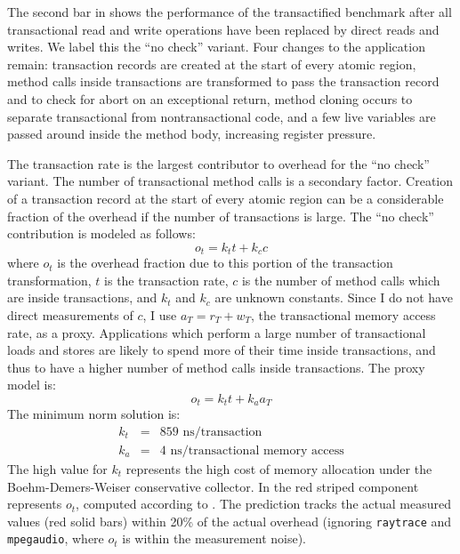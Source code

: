 
The second bar in  shows
the performance of the transactified benchmark after all transactional
read and write operations have been replaced by direct reads and
writes.   We label this the ``no check'' variant.
Four changes to the application remain: transaction records
are created at the start of every atomic region, method calls inside
transactions are transformed to pass the transaction record and to
check for abort on an exceptional return, method cloning occurs to
separate transactional from nontransactional code, and a few live
variables are passed around inside the method body, increasing
register pressure.

The transaction rate is the largest contributor
to overhead for the ``no check'' variant.  The number of transactional
method calls is a secondary factor.
Creation of a transaction record at the start of every atomic region
can be a considerable fraction of the overhead if the number of
transactions is large.  The ``no check''
contribution is modeled as follows:
\begin{equation}
o_t = k_t t + k_c c
\end{equation}
where $o_t$ is the overhead fraction due to this portion of the
transaction transformation, $t$ is the transaction rate, $c$
is the number of method calls which are inside transactions, and $k_t$
and $k_c$ are unknown constants.  Since I do not have direct
measurements of $c$, I use $a_T = r_T + w_T$,
the transactional memory access rate, as a proxy.  Applications which
perform a large number of transactional loads and stores are likely to
spend more of their time inside transactions, and thus to have a
higher number of method calls inside transactions.  The
proxy model is:
\begin{equation}\label{eqn:t-perf}
o_t = k_t t + k_a a_T
\end{equation}
The minimum norm solution is:
\begin{eqnarray*}
k_t &=& 859 \text{ ns}/\text{transaction} \\
k_a &=& 4 \text{ ns}/\text{transactional memory access}
\end{eqnarray*}
The high value for $k_t$ represents the high cost of memory allocation under
the Boehm-Demers-Weiser conservative collector.  In
 the red striped component
represents $o_t$, computed according to .  The
prediction tracks the actual measured values (red solid bars) within
20\% of the actual overhead (ignoring \texttt{raytrace} and
\texttt{mpegaudio}, where $o_t$ is within the measurement
noise).

